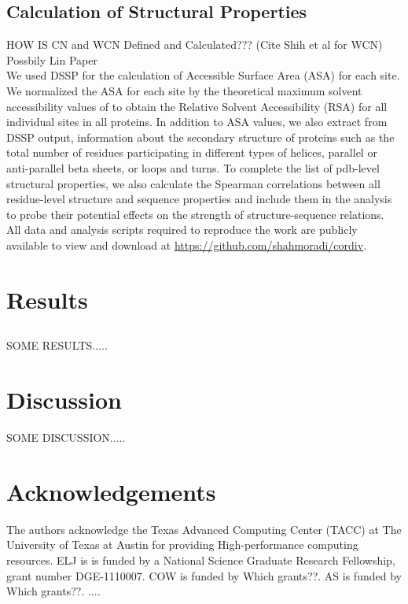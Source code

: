 \documentclass[12pt]{article}
\begin{document}
    \subsection*{Calculation of Structural Properties}
    
    HOW IS CN and WCN Defined and Calculated??? (Cite Shih et al for WCN) Possbily Lin Paper \\
\indent We used DSSP \citep{Kabschetal2005}  for the calculation of Accessible Surface Area (ASA) for each site. We normalized the ASA for each site by the theoretical maximum solvent accessibility values of \cite{Tienetal2013}  to obtain the Relative Solvent Accessibility (RSA) for all individual sites in all proteins. In addition to ASA values, we also extract from DSSP output, information about the secondary structure of proteins such as the total number of residues participating in different types of helices, parallel or anti-parallel beta sheets, or loops and turns. To complete the list of pdb-level structural properties, we also calculate the Spearman correlations between all residue-level structure and sequence properties and include them in the analysis to probe their potential effects on the strength of structure-sequence relations. \\

All data and analysis scripts required to reproduce the work are publicly available to view and download at \url{https://github.com/shahmoradi/cordiv}.


\section{Results}
\label{sec:results}

    \subsection*{}
{\color{red}SOME RESULTS.....} \\


\section{Discussion}
\label{sec:dcr}
{\color{red}SOME DISCUSSION.....} \\


\section{Acknowledgements}
The authors acknowledge the Texas Advanced Computing Center (TACC) at The University of Texas at Austin for providing High-performance computing resources. ELJ is is funded by a National Science Graduate Research Fellowship, grant number DGE-1110007. COW is funded by {\color{red} Which grants??}.  AS is funded by {\color{red} Which grants??}.
....
\end{document}
